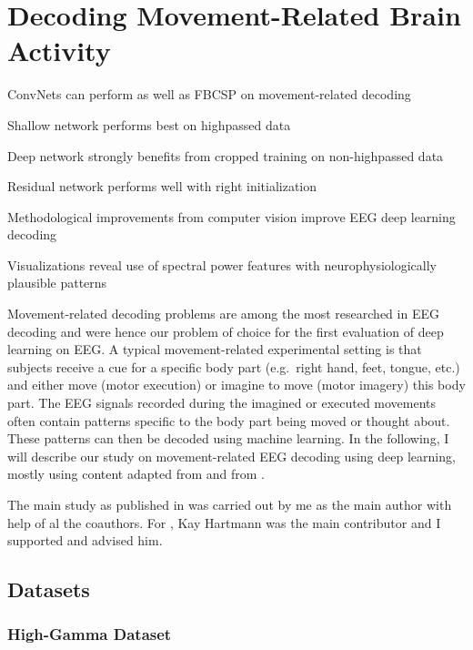 \chapter{Decoding Movement-Related Brain Activity}\label{movement-related}
\begin{startbox}{ConvNets can perform as well as FBCSP on movement-related decoding}
\item Shallow network performs best on highpassed data
\item Deep network strongly benefits from cropped training on non-highpassed data
\item Residual network performs well with right initialization
\item Methodological improvements from computer vision improve EEG deep learning decoding
\item Visualizations reveal use of spectral power features with neurophysiologically plausible patterns
\end{startbox}

    Movement-related decoding problems are among the most researched in EEG
decoding and were hence our problem of choice for the first evaluation
of deep learning on EEG. A typical movement-related experimental setting
is that subjects receive a cue for a specific body part (e.g.~right
hand, feet, tongue, etc.) and either move (motor execution) or imagine
to move (motor imagery) this body part. The EEG signals recorded during
the imagined or executed movements often contain patterns specific
to the body part being moved or thought about. These patterns can then
be decoded using machine learning. In the following, I will describe our
study on movement-related EEG decoding using deep learning, mostly using
content adapted from \citet{schirrmeisterdeephbm2017} and
from \citep{hartmann2018hierarchical}. 

The main study as published in \citet{schirrmeisterdeephbm2017} was carried out
by me as the main author with help of al the coauthors. For
\citet{hartmann2018hierarchical}, Kay Hartmann was the main
contributor and I supported and advised him.

\section{Datasets}\label{datasets}

\subsection{High-Gamma Dataset}\label{high-gamma-dataset}

